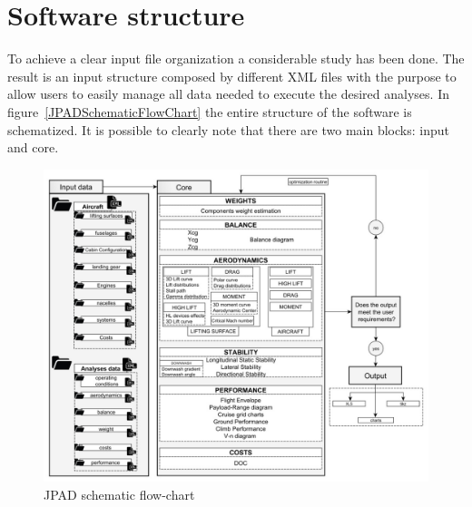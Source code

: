 \section{Software structure}
\label{sec1.1}

To achieve a clear input file organization a considerable study has been done. The result is an input structure composed by different XML files with the purpose to allow users to easily manage all data needed to execute the desired analyses. In figure~\vref{JPADSchematicFlowChart} the entire structure of the software is schematized. It is possible to clearly note that there are two main blocks: input and core.

\begin{figure}[htbp] 
\centering
\includegraphics[height=0.45\textheight]{Immagini/Capitolo1/1_1-JPADSchematicFlowChart}
\caption[JPAD schematic flow-chart] {JPAD schematic flow-chart}
\label{JPADSchematicFlowChart}
\end{figure}

